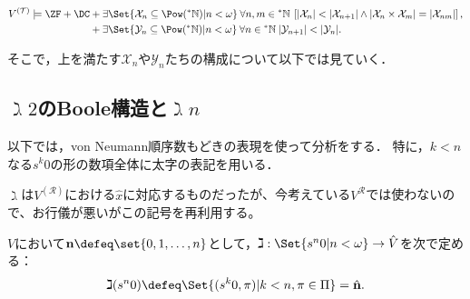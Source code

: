 \documentclass[realisability.tex]{subfiles}
\begin{document}
\begin{theorem}[Krivine]\label{thm:patho-sets-of-reals}
 \[
  V^{(\mathcal{T})}
   \models \ZF + \DC
    \begin{aligned}[t]
     &+\exists \Set{ \mathcal{X}_n \subseteq \Pow(\NN) | n < \omega } \:
     \forall n, m \in \NN \:
    \left[|\mathcal{X}_{n}| < |\mathcal{X}_{n+1}| \land |\mathcal{X}_n \times \mathcal{X}_m| = |\mathcal{X}_{nm}|\right],\\
     &+ \exists \Set{ \mathcal{Y}_n \subseteq \Pow(\NN) | n <\omega} \: \forall n \in\NN \:
       |\mathcal{Y}_{n+1}| < |\mathcal{Y}_n|.
    \end{aligned}
 \]
\end{theorem}

そこで，上を満たす$\mathcal{X}_n$や$\mathcal{Y}_n$たちの構成について以下では見ていく．

\subsection{$\gimel 2$のBoole構造と$\gimel n$}
以下では，von Neumann順序数もどきの表現を使って分析をする．
特に，$k < n$なる$s^k 0$の形の数項全体に太字の表記を用いる．

$\gimel$は$V^{(\mathcal{R})}$における$\hat{x}$に対応するものだったが、今考えている$V^{\mathcal{R}}$では使わないので、お行儀が悪いがこの記号を再利用する。
\begin{notation}
 $V$において$\mathbf{n} \defeq \set{0, 1, \dots, n}$として，$\gimel : \Set{ s^n 0 | n < \omega } \to \hat{V}$を次で定める：
 \[
  \gimel(s^n 0) \defeq \Set{ (s^k 0, \pi) | k < n, \pi \in \Pi } = \hat{\mathbf{n}}.
 \]
\end{notation}
\end{document}
